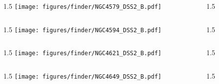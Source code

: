\documentclass[final]{beamer}
\newlength{\colwidth}
\begin{document}

\begin{frame}[t]{}
  \begin{columns}[T]
    \begin{column}{1.5\colwidth}
      \centering
      \texttt{[image: figures/finder/NGC4579\_DSS2\_B.pdf]}
    \end{column}
    \begin{column}{1.5\colwidth}
      \Large
      
    \end{column}
  \end{columns}
  \vspace{\fill}
  \begin{columns}[T]
    \begin{column}{1.5\colwidth}
      \centering
      \texttt{[image: figures/finder/NGC4594\_DSS2\_B.pdf]}
    \end{column}
    \begin{column}{1.5\colwidth}
      \Large
      
    \end{column}
  \end{columns}
\end{frame}


\begin{frame}[t]{}
  \begin{columns}[T]
    \begin{column}{1.5\colwidth}
      \centering
      \texttt{[image: figures/finder/NGC4621\_DSS2\_B.pdf]}
    \end{column}
    \begin{column}{1.5\colwidth}
      \Large
      
    \end{column}
  \end{columns}
  \vspace{\fill}
  \begin{columns}[T]
    \begin{column}{1.5\colwidth}
      \centering
      \texttt{[image: figures/finder/NGC4649\_DSS2\_B.pdf]}
    \end{column}
    \begin{column}{1.5\colwidth}
      \Large
      
    \end{column}
  \end{columns}
\end{frame}
\end{document}
